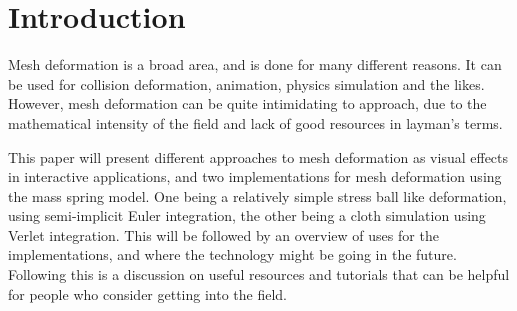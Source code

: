 \chapter{Introduction}
\label{chap:introduction}
Mesh deformation is a broad area, and is done for many different reasons.
It can be used for collision deformation, animation, physics simulation and the likes.
However, mesh deformation can be quite intimidating to approach, due to the mathematical intensity of the field and lack of good resources in layman's terms.

This paper will present different approaches to mesh deformation as visual effects in interactive applications, 
and two implementations for mesh deformation using the mass spring model. 
One being a relatively simple stress ball like deformation, using semi-implicit Euler integration,
the other being a cloth simulation using Verlet integration.
This will be followed by an overview of uses for the implementations, and where the technology might be going in the future.
Following this is a discussion on useful resources and tutorials that can be helpful for people who consider getting into the field.

